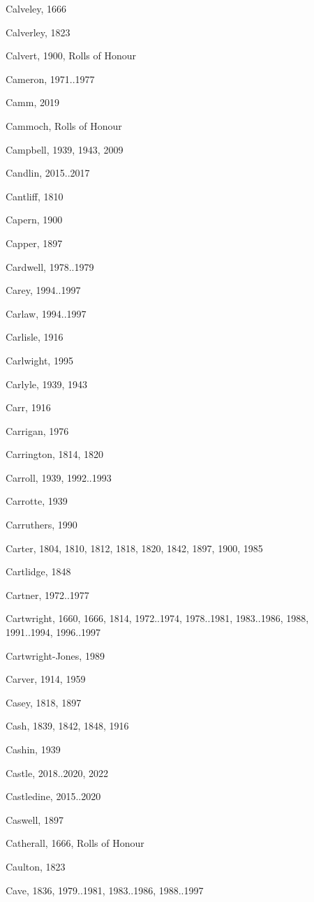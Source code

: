 \begin{theindex}
\item Calveley, 1666
\item Calverley, 1823
\item Calvert, 1900, Rolls of Honour
\item Cameron, 1971..1977
\item Camm, 2019
\item Cammoch, Rolls of Honour
\item Campbell, 1939, 1943, 2009
\item Candlin, 2015..2017
\item Cantliff, 1810
\item Capern, 1900
\item Capper, 1897
\item Cardwell, 1978..1979
\item Carey, 1994..1997
\item Carlaw, 1994..1997
\item Carlisle, 1916
\item Carlwight, 1995
\item Carlyle, 1939, 1943
\item Carr, 1916
\item Carrigan, 1976
\item Carrington, 1814, 1820
\item Carroll, 1939, 1992..1993
\item Carrotte, 1939
\item Carruthers, 1990
\item Carter, 1804, 1810, 1812, 1818, 1820, 1842, 1897, 1900, 1985
\item Cartlidge, 1848
\item Cartner, 1972..1977
\item Cartwright, 1660, 1666, 1814, 1972..1974, 1978..1981, 1983..1986, 1988, 1991..1994, 1996..1997
\item Cartwright-Jones, 1989
\item Carver, 1914, 1959
\item Casey, 1818, 1897
\item Cash, 1839, 1842, 1848, 1916
\item Cashin, 1939
\item Castle, 2018..2020, 2022
\item Castledine, 2015..2020
\item Caswell, 1897
\item Catherall, 1666, Rolls of Honour
\item Caulton, 1823
\item Cave, 1836, 1979..1981, 1983..1986, 1988..1997

\end{theindex}
